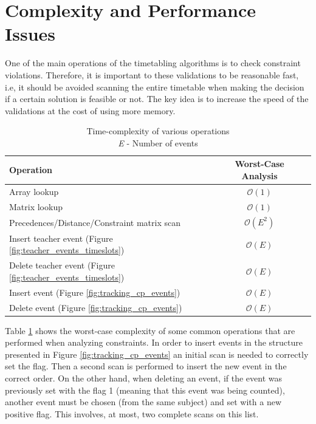 \section{Complexity and Performance Issues}

One of the main operations of the timetabling algorithms is to check constraint violations. Therefore, it is important to these validations to be reasonable fast, i.e, it should be avoided scanning the entire timetable when making the decision if a certain solution is feasible or not. The key idea is to increase the speed of the validations at the cost of using more memory.
\label{lab:complexity_analysis}

\begin{table}[H]
\centering
\begin{tabular}{|l|c|c|}
\hline
	Operation & Worst-Case Analysis \\
\hline
	Array lookup & $\mathcal{O}(1)$ \\
	\hline
	Matrix lookup & $\mathcal{O}(1)$ \\
	\hline
	Precedences/Distance/Constraint matrix scan & $\mathcal{O}(E^2)$ \\
	\hline
	Insert teacher event (Figure \ref{fig:teacher_events_timeslots}) & $\mathcal{O}(E)$ \\
	\hline
	Delete teacher event (Figure \ref{fig:teacher_events_timeslots}) & $\mathcal{O}(E)$ \\
	\hline
	Insert event (Figure \ref{fig:tracking_cp_events}) & $\mathcal{O}(E)$ \\
	\hline
	Delete event (Figure \ref{fig:tracking_cp_events})& $\mathcal{O}(E)$\\
\hline
\end{tabular}
\caption[Time-complexity of various operations]{Time-complexity of various operations\\ \textit{E} - Number of events}
\label{tab:complexity_operations}
\end{table}

Table \ref{tab:complexity_operations} shows the worst-case complexity of some common operations that are performed when analyzing constraints. In order to insert events in the structure presented in Figure \ref{fig:tracking_cp_events} an initial scan is needed to correctly set the flag. Then a second scan is performed to insert the new event in the correct order. On the other hand, when deleting an event, if the event was previously set with the flag 1 (meaning that this event was being counted), another event must be chosen (from the same subject) and set with a new positive flag. This involves, at most, two complete scans on this list.

